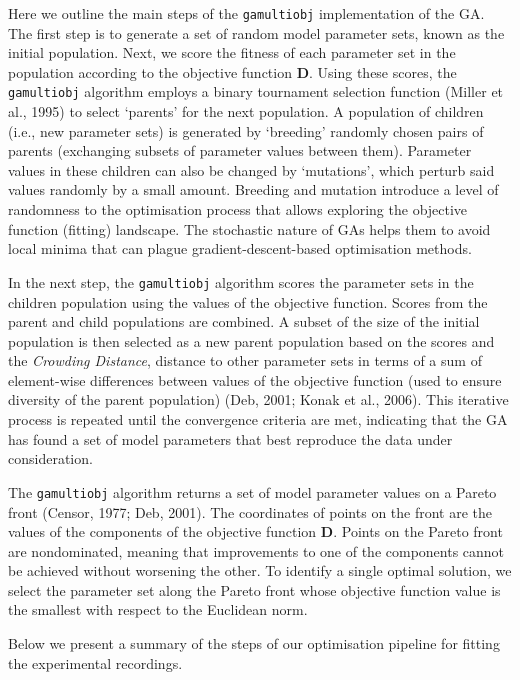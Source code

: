 \documentclass[
  11pt,
  letterpaper,
  DIV=11,
  numbers=noendperiod]{scrartcl}
\begin{document}
Here we outline the main steps of the \texttt{gamultiobj} implementation
of the GA. The first step is to generate a set of random model parameter
sets, known as the initial population. Next, we score the fitness of
each parameter set in the population according to the objective function
\(\mathbf{D}\). Using these scores, the \texttt{gamultiobj} algorithm
employs a binary tournament selection function ({Miller et al.}, 1995)
to select `parents' for the next population. A population of children
(i.e., new parameter sets) is generated by `breeding' randomly chosen
pairs of parents (exchanging subsets of parameter values between them).
Parameter values in these children can also be changed by `mutations',
which perturb said values randomly by a small amount. Breeding and
mutation introduce a level of randomness to the optimisation process
that allows exploring the objective function (fitting) landscape. The
stochastic nature of GAs helps them to avoid local minima that can
plague gradient-descent-based optimisation methods.

In the next step, the \texttt{gamultiobj} algorithm scores the parameter
sets in the children population using the values of the objective
function. Scores from the parent and child populations are combined. A
subset of the size of the initial population is then selected as a new
parent population based on the scores and the \emph{Crowding Distance},
distance to other parameter sets in terms of a sum of element-wise
differences between values of the objective function (used to ensure
diversity of the parent population) (Deb, 2001; Konak et al., 2006).
This iterative process is repeated until the convergence criteria are
met, indicating that the GA has found a set of model parameters that
best reproduce the data under consideration.

The \texttt{gamultiobj} algorithm returns a set of model parameter
values on a Pareto front (Censor, 1977; Deb, 2001). The coordinates of
points on the front are the values of the components of the objective
function \(\mathbf{D}\). Points on the Pareto front are nondominated,
meaning that improvements to one of the components cannot be achieved
without worsening the other. To identify a single optimal solution, we
select the parameter set along the Pareto front whose objective function
value is the smallest with respect to the Euclidean norm.

Below we present a summary of the steps of our optimisation pipeline for
fitting the experimental recordings.
\end{document}
